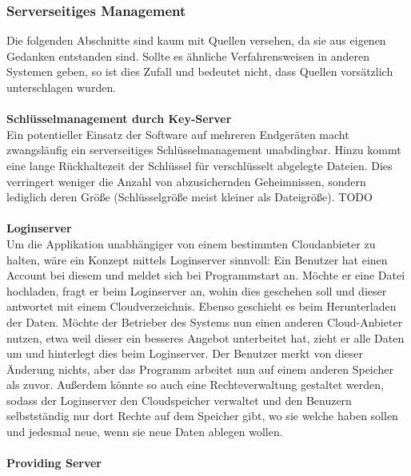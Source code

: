 \documentclass[13pt,a4paper,bibliography=totocnumbered,listof=totocnumbered]{scrartcl}
\begin{document}
\subsubsection{Serverseitiges Management}
Die folgenden Abschnitte sind kaum mit Quellen versehen, da sie aus eigenen Gedanken entstanden sind. Sollte es ähnliche Verfahrensweisen in anderen Systemen geben, so ist dies Zufall und bedeutet nicht, dass Quellen vorsätzlich unterschlagen wurden.\\\\
\textbf{Schlüsselmanagement durch Key-Server}\\
Ein potentieller Einsatz der Software auf mehreren Endgeräten macht zwangsläufig ein serverseitiges Schlüsselmanagement unabdingbar. Hinzu kommt eine lange Rückhaltezeit der Schlüssel für verschlüsselt abgelegte Dateien. Dies verringert weniger die Anzahl von abzusichernden Geheimnissen, sondern lediglich deren Größe (Schlüsselgröße meist kleiner als Dateigröße). TODO \cite{38}\\
\\\textbf{Loginserver}\\
Um die Applikation unabhängiger von einem bestimmten Cloudanbieter zu halten, wäre ein Konzept mittels Loginserver sinnvoll: Ein Benutzer hat einen Account bei diesem und meldet sich bei Programmstart an. Möchte er eine Datei hochladen, fragt er beim Loginserver an, wohin dies geschehen soll und dieser antwortet mit einem Cloudverzeichnis. Ebenso geschieht es beim Herunterladen der Daten. Möchte der Betrieber des Systems nun einen anderen Cloud-Anbieter nutzen, etwa weil dieser ein besseres Angebot unterbeitet hat, zieht er alle Daten um und hinterlegt dies beim Loginserver. Der Benutzer merkt von dieser Änderung nichts, aber das Programm arbeitet nun auf einem anderen Speicher als zuvor. Außerdem könnte so auch eine Rechteverwaltung gestaltet werden, sodass der Loginserver den Cloudspeicher verwaltet und den Benuzern selbstständig nur dort Rechte auf dem Speicher gibt, wo sie welche haben sollen und jedesmal neue, wenn sie neue Daten ablegen wollen.\\
\\\textbf{Providing Server}\label{provV}\\
\end{document}
